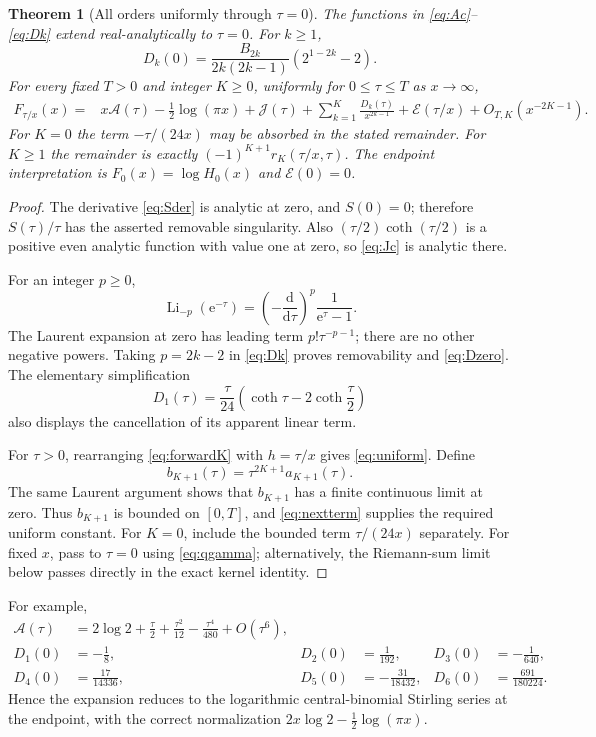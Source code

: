 \documentclass[11pt,a4paper]{article}
\newtheorem{theorem}{Theorem}[section]
\theoremstyle{definition}
\theoremstyle{remark}
\newcommand{\e}{\mathrm e}
\newcommand{\Li}{\operatorname{Li}}
\newcommand{\Ecal}{\mathcal E}
\newcommand{\Acal}{\mathcal A}
\newcommand{\Jcal}{\mathcal J}
\begin{document}
\begin{theorem}[All orders uniformly through $\tau=0$]
\label{thm:uniform}
The functions in \eqref{eq:Ac}--\eqref{eq:Dk} extend real-analytically to
$\tau=0$. For $k\ge1$,
\begin{equation}
 D_k(0)=\frac{B_{2k}}{2k(2k-1)}(2^{1-2k}-2).
 \label{eq:Dzero}
\end{equation}
For every fixed $T>0$ and integer $K\ge0$, uniformly for $0\le\tau\le T$
as $x\to\infty$,
\begin{align}
 F_{\tau/x}(x)={}&x\Acal(\tau)-\frac12\log(\pi x)+\Jcal(\tau)
 +\sum_{k=1}^K\frac{D_k(\tau)}{x^{2k-1}}
 +\Ecal(\tau/x)+O_{T,K}(x^{-2K-1}).
 \label{eq:uniform}
\end{align}
For $K=0$ the term $-\tau/(24x)$ may be absorbed in the stated remainder.
For $K\ge1$ the remainder is exactly $(-1)^{K+1}r_K(\tau/x,\tau)$.
The endpoint interpretation is $F_0(x)=\log H_0(x)$ and $\Ecal(0)=0$.
\end{theorem}
\begin{proof}
The derivative \eqref{eq:Sder} is analytic at zero, and $S(0)=0$;
therefore $S(\tau)/\tau$ has the asserted removable singularity.
Also $(\tau/2)\coth(\tau/2)$ is a positive even analytic function with
value one at zero, so \eqref{eq:Jc} is analytic there.

For an integer $p\ge0$,
\[
 \Li_{-p}(\e^{-\tau})=
 \left(-\frac{\mathrm d}{\mathrm d\tau}\right)^p\frac1{\e^\tau-1}.
\]
The Laurent expansion at zero has leading term $p!\tau^{-p-1}$;
there are no other negative powers. Taking $p=2k-2$ in \eqref{eq:Dk}
proves removability and \eqref{eq:Dzero}. The elementary simplification
\[
 D_1(\tau)=\frac\tau{24}\left(\coth\tau-2\coth\frac\tau2\right)
\]
also displays the cancellation of its apparent linear term.

For $\tau>0$, rearranging \eqref{eq:forwardK} with $h=\tau/x$ gives
\eqref{eq:uniform}. Define
\[
 b_{K+1}(\tau)=\tau^{2K+1}a_{K+1}(\tau).
\]
The same Laurent argument shows that $b_{K+1}$ has a finite continuous
limit at zero. Thus $b_{K+1}$ is bounded on $[0,T]$, and
\eqref{eq:nextterm} supplies the required uniform constant. For $K=0$,
include the bounded term $\tau/(24x)$ separately. For fixed $x$, pass to
$\tau=0$ using \eqref{eq:qgamma}; alternatively, the Riemann-sum limit
below passes directly in the exact kernel identity.
\end{proof}

For example,
\begin{align*}
 \Acal(\tau)&=2\log2+\frac\tau2+\frac{\tau^2}{12}
                          -\frac{\tau^4}{480}+O(\tau^6),\\
 D_1(0)&=-\frac18, & D_2(0)&=\frac1{192}, &D_3(0)&=-\frac1{640},\\
 D_4(0)&=\frac{17}{14336},&D_5(0)&=-\frac{31}{18432},
 &D_6(0)&=\frac{691}{180224}.
\end{align*}
Hence the expansion reduces to the logarithmic central-binomial Stirling
series at the endpoint, with the correct normalization
$2x\log2-\tfrac12\log(\pi x)$.
\end{document}
